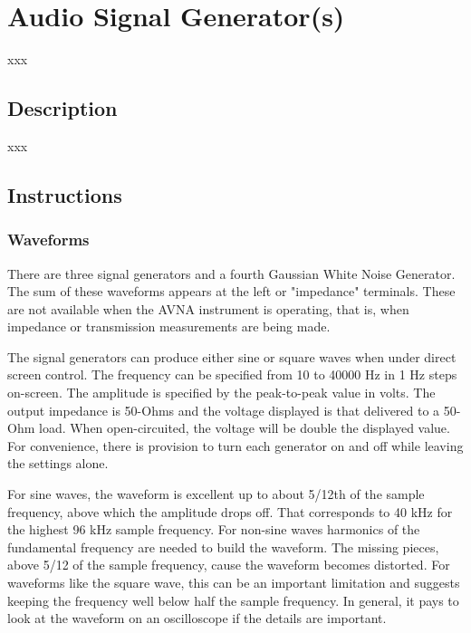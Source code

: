 \section{Audio Signal Generator(s)}
xxx
\subsection{Description}
xxx      



\subsection{Instructions}
\subsubsection{Waveforms}
There are three signal generators and a fourth Gaussian White Noise Generator. The sum of these waveforms appears at the left or "impedance" terminals.  These are not available when the AVNA instrument is operating, that is, when impedance or transmission measurements are being made.

The signal generators can produce either sine or square waves when under direct screen control.  The frequency can be specified from 10 to 40000 Hz in 1 Hz steps on-screen.  The amplitude is specified by the peak-to-peak value in volts.  The output impedance is 50-Ohms and the voltage displayed is that delivered to a 50-Ohm load. When open-circuited, the voltage will be double the displayed value.  For convenience, there is provision to turn each generator on and off while leaving the settings alone.

For sine waves, the waveform is excellent up to about 5/12th of the sample frequency, above which the amplitude drops off.   That corresponds to 40 kHz for the highest 96 kHz sample frequency.  For non-sine waves harmonics of the fundamental frequency are needed to build the waveform.  The missing pieces, above 5/12 of the sample frequency, cause the waveform becomes distorted.  For waveforms like the square wave, this can be an important limitation and suggests keeping the frequency well below half the sample frequency.  In general, it pays to look at the waveform on an oscilloscope if the details are important.

